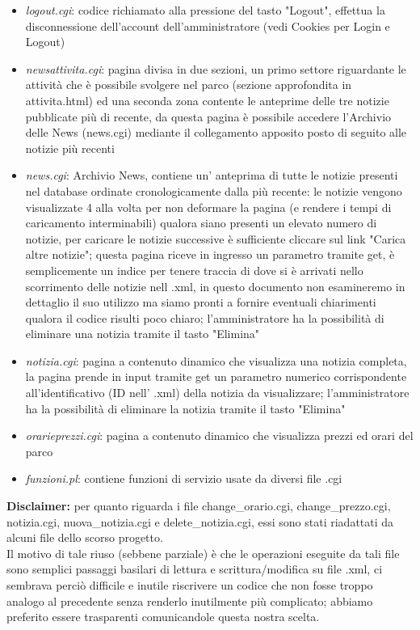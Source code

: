 \documentclass[12pt]{article}
\begin{document}
\begin{itemize}
\item \textit{logout.cgi}: codice richiamato alla pressione del tasto "Logout", effettua la disconnessione dell'account dell'amministratore (vedi Cookies per Login e Logout)
\item \textit{newsattivita.cgi}:  pagina divisa in due sezioni, un primo settore riguardante le attivit\`a che \`e possibile svolgere nel parco (sezione approfondita in attivita.html) ed una seconda zona contente le anteprime delle tre notizie pubblicate pi\`u di recente, da questa pagina \`e possibile accedere l'Archivio delle News (news.cgi) mediante il collegamento apposito posto di seguito alle notizie pi\`u recenti
\item \textit{news.cgi}: Archivio News, contiene un' anteprima di tutte le notizie presenti nel database ordinate cronologicamente dalla pi\`u recente: le notizie vengono visualizzate 4 alla volta per non deformare la pagina (e rendere i tempi di caricamento interminabili) qualora siano presenti un elevato numero di notizie, per caricare le notizie successive \`e sufficiente cliccare sul link "Carica altre notizie"; questa pagina riceve in ingresso un parametro tramite get, \`e semplicemente un indice per tenere traccia di dove si \`e arrivati nello scorrimento delle notizie nell .xml, in questo documento non esamineremo in dettaglio il suo utilizzo ma siamo pronti a fornire eventuali chiarimenti qualora il codice risulti poco chiaro; l'amministratore ha la possibilit\`a di eliminare una notizia tramite il tasto "Elimina"
\item \textit{notizia.cgi}: pagina a contenuto dinamico che visualizza una notizia completa, la pagina prende in input tramite get un parametro numerico corrispondente all'identificativo (ID nell' .xml) della notizia da visualizzare; l'amministratore ha la possibilit\`a di eliminare la notizia tramite il tasto "Elimina"
\item \textit{orarieprezzi.cgi}: pagina a contenuto dinamico che visualizza prezzi ed orari del parco
\item \textit{funzioni.pl}: contiene funzioni di servizio usate da diversi file .cgi
\end{itemize}	

\textbf{Disclaimer:} per quanto riguarda i file change\_orario.cgi, change\_prezzo.cgi, notizia.cgi, nuova\_notizia.cgi e delete\_notizia.cgi, essi sono stati riadattati da alcuni file dello scorso progetto. 
\\ Il motivo di tale riuso (sebbene parziale) \`e che le operazioni eseguite da tali file sono semplici passaggi basilari di lettura e scrittura/modifica su file .xml, ci sembrava perci\`o difficile e inutile riscrivere un codice che non fosse troppo analogo al precedente senza renderlo inutilmente pi\`u complicato; abbiamo preferito essere trasparenti comunicandole questa nostra scelta.
\end{document}
